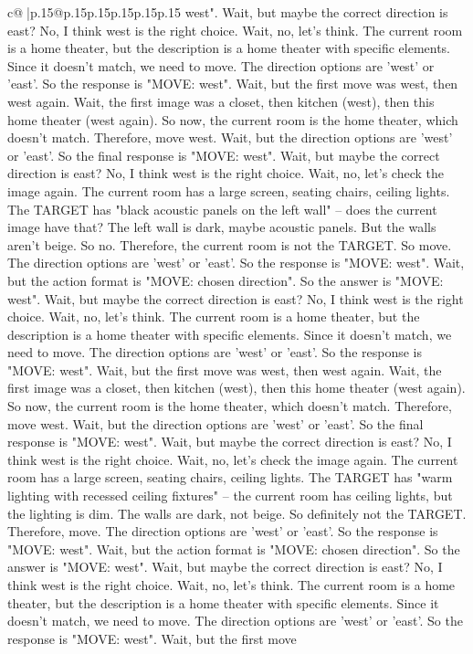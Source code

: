 \documentclass{article}
\begin{document}
{\begin{supertabular}{c@{$\;$}|p{.15\linewidth}@{}p{.15\linewidth}p{.15\linewidth}p{.15\linewidth}p{.15\linewidth}p{.15\linewidth}}
{{{west". Wait, but maybe the correct direction is east? No, I think west is the right choice. Wait, no, let's think. The current room is a home theater, but the description is a home theater with specific elements. Since it doesn't match, we need to move. The direction options are 'west' or 'east'. So the response is "MOVE: west". Wait, but the first move was west, then west again. Wait, the first image was a closet, then kitchen (west), then this home theater (west again). So now, the current room is the home theater, which doesn't match. Therefore, move west. Wait, but the direction options are 'west' or 'east'. So the final response is "MOVE: west". Wait, but maybe the correct direction is east? No, I think west is the right choice. Wait, no, let's check the image again. The current room has a large screen, seating chairs, ceiling lights. The TARGET has "black acoustic panels on the left wall" – does the current image have that? The left wall is dark, maybe acoustic panels. But the walls aren't beige. So no. Therefore, the current room is not the TARGET. So move. The direction options are 'west' or 'east'. So the response is "MOVE: west". Wait, but the action format is "MOVE: chosen direction". So the answer is "MOVE: west". Wait, but maybe the correct direction is east? No, I think west is the right choice. Wait, no, let's think. The current room is a home theater, but the description is a home theater with specific elements. Since it doesn't match, we need to move. The direction options are 'west' or 'east'. So the response is "MOVE: west". Wait, but the first move was west, then west again. Wait, the first image was a closet, then kitchen (west), then this home theater (west again). So now, the current room is the home theater, which doesn't match. Therefore, move west. Wait, but the direction options are 'west' or 'east'. So the final response is "MOVE: west". Wait, but maybe the correct direction is east? No, I think west is the right choice. Wait, no, let's check the image again. The current room has a large screen, seating chairs, ceiling lights. The TARGET has "warm lighting with recessed ceiling fixtures" – the current room has ceiling lights, but the lighting is dim. The walls are dark, not beige. So definitely not the TARGET. Therefore, move. The direction options are 'west' or 'east'. So the response is "MOVE: west". Wait, but the action format is "MOVE: chosen direction". So the answer is "MOVE: west". Wait, but maybe the correct direction is east? No, I think west is the right choice. Wait, no, let's think. The current room is a home theater, but the description is a home theater with specific elements. Since it doesn't match, we need to move. The direction options are 'west' or 'east'. So the response is "MOVE: west". Wait, but the first move 
	  } 
	   } 
	   } 
	  \\ 
 


\end{supertabular}}
\end{document}
